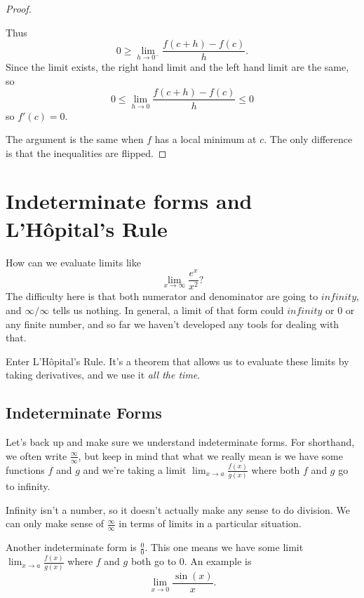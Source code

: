 \documentclass[11pt]{book}
\numberwithin{example}{chapter}
\begin{document}
\begin{proof}
\begin{center}
\end{center}


Thus $$0\geq \lim_{h\to 0^-}\frac{f(c+h)-f(c)}{h}.$$
Since the limit exists, the right hand limit and the left hand limit are the same, so 
$$0\leq \lim_{h\to 0}\frac{f(c+h)-f(c)}{h} \leq 0$$
so $f'(c)=0$.

The argument is the same when $f$ has a local minimum at $c$.  The only difference is that the inequalities are flipped.  

\end{proof}




\section{Indeterminate forms and L'H\^{o}pital's Rule}

How can we evaluate limits like 
$$\lim_{x\to \infty} \frac{e^x}{x^2}?$$
The difficulty here is that both numerator and denominator are going to $infinity$, and $\infty/\infty$ tells us nothing.  In general, a limit of that form could $infinity$ or 0 or any finite number, and so far we haven't developed any tools for dealing with that.  


Enter L'H\^{o}pital's Rule.  It's a theorem that allows us to evaluate these limits by taking derivatives, and we use it \emph{all the time}.  

\subsection{Indeterminate Forms}

Let's back up and make sure we understand indeterminate forms.  For shorthand, we often write $\frac{\infty}{\infty}$, but keep in mind that what we really mean is we have some functions $f$ and $g$ and we're taking a limit $\lim_{x\to a}\frac{f(x)}{g(x)}$ where both $f$ and $g$ go to infinity.

Infinity isn't a number, so it doesn't actually make any sense to do division.  We can only make sense of $\frac{\infty}{\infty}$ in terms of limits in a particular situation.

Another indeterminate form is $\frac{0}{0}$.  This one means we have some limit  $\lim_{x\to a}\frac{f(x)}{g(x)}$ where $f$ and $g$ both go to 0.  An example is $$\lim_{x\to 0}\frac{\sin(x)}{x}.$$
\end{document}

